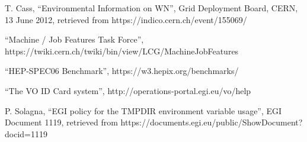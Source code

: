 \documentclass[12pt,a4paper]{article}
\begin{document}


\begin{thebibliography}{9}

 T. Cass, ``Environmental Information on WN'', Grid
Deployment Board, CERN, 13 June 2012, retrieved from
https://indico.cern.ch/event/155069/

 ``Machine / Job Features Task Force'', \\
 https://twiki.cern.ch/twiki/bin/view/LCG/MachineJobFeatures

 ``HEP-SPEC06 Benchmark'', https://w3.hepix.org/benchmarks/

 ``The VO ID Card system'', http://operations-portal.egi.eu/vo/help

 P. Solagna, ``EGI policy for the TMPDIR environment variable usage'',
 EGI Document 1119, retrieved from https://documents.egi.eu/public/ShowDocument?docid=1119



\end{thebibliography}


\end{document}
